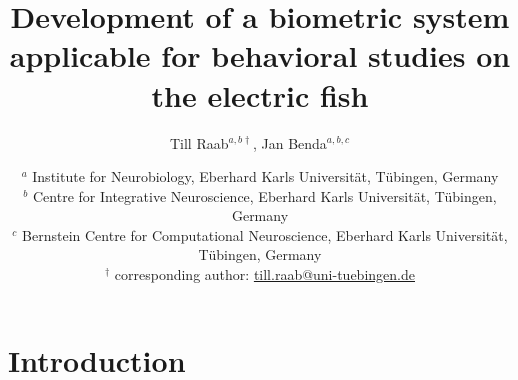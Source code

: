 \documentclass[11pt,pdftex]{article}
\title{Development of a biometric system applicable for behavioral studies on the electric fish \lepto{}}
\author{Till Raab$^{a,b\dagger}$, Jan Benda$^{a,b,c}$}
\date{\normalsize $^a$ Institute for Neurobiology, Eberhard Karls Universit\"at, T\"ubingen, Germany\\
  $^b$ Centre for Integrative Neuroscience, Eberhard Karls Universit\"at, T\"ubingen, Germany\\
  $^c$ Bernstein Centre for Computational Neuroscience, Eberhard Karls Universit\"at, T\"ubingen, Germany\\
$^{\dagger}$ corresponding author: \url{till.raab@uni-tuebingen.de}
}
\newenvironment{keywords}%
{\paragraph{Keywords}\begin{itemize*}[label={},itemjoin={~$|$\ },afterlabel={}]}%
{\end{itemize*}\par}
\begin{document}

\maketitle

%
%
%
%
%

\section{Introduction}
\end{document}

